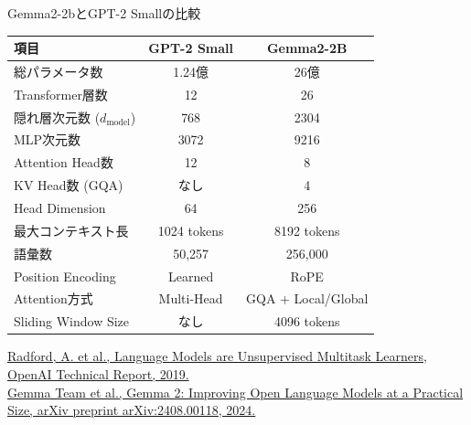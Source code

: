 \documentclass[aspectratio=43,xcolor=dvipsnames]{beamer}
\begin{document}
\begin{frame}{Gemma2-2bとGPT-2 Smallの比較}
    \footnotesize
    \begin{table}[h]
        \centering
        \begin{tabular}{lcc}
            \hline
            項目 & GPT-2 Small & Gemma2-2B \\
            \hline
            総パラメータ数 & 1.24億 & 26億 \\
            Transformer層数 & 12 & 26 \\
            隠れ層次元数 ($d_{\mathrm{model}}$) & 768 & 2304 \\
            MLP次元数 & 3072 & 9216 \\
            Attention Head数 & 12 & 8 \\
            KV Head数 (GQA) & なし & 4 \\
            Head Dimension & 64 & 256 \\
            最大コンテキスト長 & 1024 tokens & 8192 tokens \\
            語彙数 & 50,257 & 256,000 \\
            Position Encoding & Learned & RoPE \\
            Attention方式 & Multi-Head & GQA + Local/Global \\
            Sliding Window Size & なし & 4096 tokens \\
            \hline
        \end{tabular}
    \end{table}

\vspace{0.5em}

\tiny

\href{https://cdn.openai.com/better-language-models/language_models_are_unsupervised_multitask_learners.pdf}
{Radford, A. et al., Language Models are Unsupervised Multitask Learners, OpenAI Technical Report, 2019.}\\

\href{https://arxiv.org/abs/2408.00118}
{Gemma Team et al., Gemma 2: Improving Open Language Models at a Practical Size, arXiv preprint arXiv:2408.00118, 2024.}

\end{frame}
\end{document}
